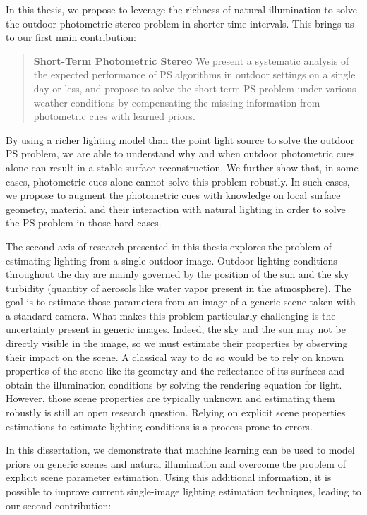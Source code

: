 In this thesis, we propose to leverage the richness of natural illumination to solve the outdoor photometric stereo problem in shorter time intervals. This brings us to our first main contribution: 

\begin{quotation}
\textbf{Short-Term Photometric Stereo} We present a systematic analysis of the expected performance of PS algorithms in outdoor settings on a single day or less, and propose to solve the short-term PS problem under various weather conditions by compensating the missing information from photometric cues with learned priors. 
\end{quotation}

By using a richer lighting model than the point light source to solve the outdoor PS problem, we are able to understand why and when outdoor photometric cues alone can result in a stable surface reconstruction. We further show that, in some cases, photometric cues alone cannot solve this problem robustly. In such cases, we propose to augment the photometric cues with knowledge on local surface geometry, material and their interaction with natural lighting in order to solve the PS problem in those hard cases. 

The second axis of research presented in this thesis explores the problem of estimating lighting from a single outdoor image. Outdoor lighting conditions throughout the day are mainly governed by the position of the sun and the sky turbidity (quantity of aerosols like water vapor present in the atmosphere). The goal is to estimate those parameters from an image of a generic scene taken with a standard camera. What makes this problem particularly challenging is the uncertainty present in generic images. Indeed, the sky and the sun may not be directly visible in the image, so we must estimate their properties by observing their impact on the scene. A classical way to do so would be to rely on known properties of the scene like its geometry and the reflectance of its surfaces and obtain the illumination conditions by solving the rendering equation for light. However, those scene properties are typically unknown and estimating them robustly is still an open research question. Relying on explicit scene properties estimations to estimate lighting conditions is a process prone to errors. 

In this dissertation, we demonstrate that machine learning can be used to model priors on generic scenes and natural illumination and overcome the problem of explicit scene parameter estimation. Using this additional information, it is possible to improve current single-image lighting estimation techniques, leading to our second contribution: 

